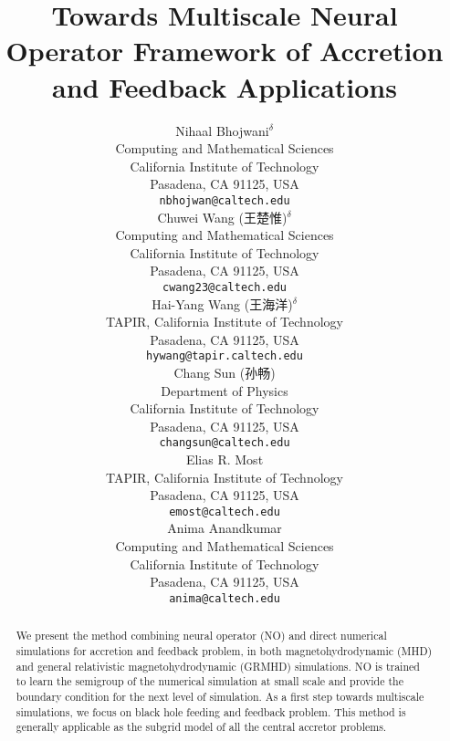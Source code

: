 \documentclass{article}
\newcommand{\hyw}[1]{{\color{red}{[{#1}]}}}
\begin{document}
\begin{CJK*}{UTF8}{gbsn}
\title{Towards Multiscale Neural Operator Framework of Accretion and Feedback Applications}

\author{%
  Nihaal Bhojwani$^{\delta}$ \\
  Computing and Mathematical Sciences\\
  California Institute of Technology\\
  Pasadena, CA 91125, USA \\
  \texttt{nbhojwan@caltech.edu} \\
  \And
  Chuwei Wang (王楚惟)$^{\delta}$ \\
  Computing and Mathematical Sciences\\
  California Institute of Technology\\
  Pasadena, CA 91125,   USA \\
  \texttt{cwang23@caltech.edu} \\
  \And
  Hai-Yang Wang (王海洋)$^{\delta}$ \\
  TAPIR, California Institute of Technology\\
  Pasadena, CA 91125, USA \\
  \texttt{hywang@tapir.caltech.edu} \\
  \And
  Chang Sun (孙畅) \\
  Department of Physics\\
  California Institute of Technology\\
  Pasadena, CA 91125, USA \\
  \texttt{changsun@caltech.edu} \\
  \And
  Elias R. Most \\
  TAPIR, California Institute of Technology\\
  Pasadena, CA 91125, USA \\
  \texttt{emost@caltech.edu} \\
  \And
  Anima Anandkumar \\
  Computing and Mathematical Sciences\\
  California Institute of Technology\\
  Pasadena, CA 91125, USA \\
  \texttt{anima@caltech.edu} \\
}

\maketitle

\begin{abstract}
We present the method combining neural operator (NO) and direct \hyw{multi-level} numerical simulations for accretion and feedback problem, in both magnetohydrodynamic (MHD) and general relativistic magnetohydrodynamic (GRMHD) simulations. 
NO is trained to learn the semigroup of the numerical simulation at small scale and provide the boundary condition for the next level of simulation.
As a first step towards multiscale simulations, we focus on black hole feeding and feedback problem.
\hyw{Findings:}
This method is generally applicable as the subgrid model of all the central accretor problems.
\end{abstract}



\end{CJK*}
\end{document}
